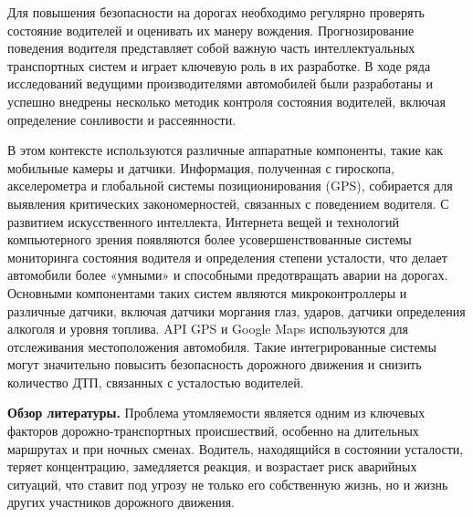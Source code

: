 \documentclass[
]{article}
\begin{document}
Для повышения безопасности на дорогах необходимо регулярно проверять
состояние водителей и оценивать их манеру вождения. Прогнозирование
поведения водителя представляет собой важную часть интеллектуальных
транспортных систем и играет ключевую роль в их разработке. В ходе ряда
исследований ведущими производителями автомобилей были разработаны и
успешно внедрены несколько методик контроля состояния водителей, включая
определение сонливости и рассеянности.

В этом контексте используются различные аппаратные компоненты, такие как
мобильные камеры и датчики. Информация, полученная с гироскопа,
акселерометра и глобальной системы позиционирования (GPS), собирается
для выявления критических закономерностей, связанных с поведением
водителя. С развитием искусственного интеллекта, Интернета вещей и
технологий компьютерного зрения появляются более усовершенствованные
системы мониторинга состояния водителя и определения степени усталости,
что делает автомобили более «умными» и способными предотвращать аварии
на дорогах. Основными компонентами таких систем являются
микроконтроллеры и различные датчики, включая датчики моргания глаз,
ударов, датчики определения алкоголя и уровня топлива. API GPS и Google
Maps используются для отслеживания местоположения автомобиля. Такие
интегрированные системы могут значительно повысить безопасность
дорожного движения и снизить количество ДТП, связанных с усталостью
водителей.

\textbf{Обзор литературы.} Проблема утомляемости является одним из
ключевых факторов дорожно-транспортных происшествий, особенно на
длительных маршрутах и при ночных сменах. Водитель, находящийся в
состоянии усталости, теряет концентрацию, замедляется реакция, и
возрастает риск аварийных ситуаций, что ставит под угрозу не только его
собственную жизнь, но и жизнь других участников дорожного движения.
\end{document}
